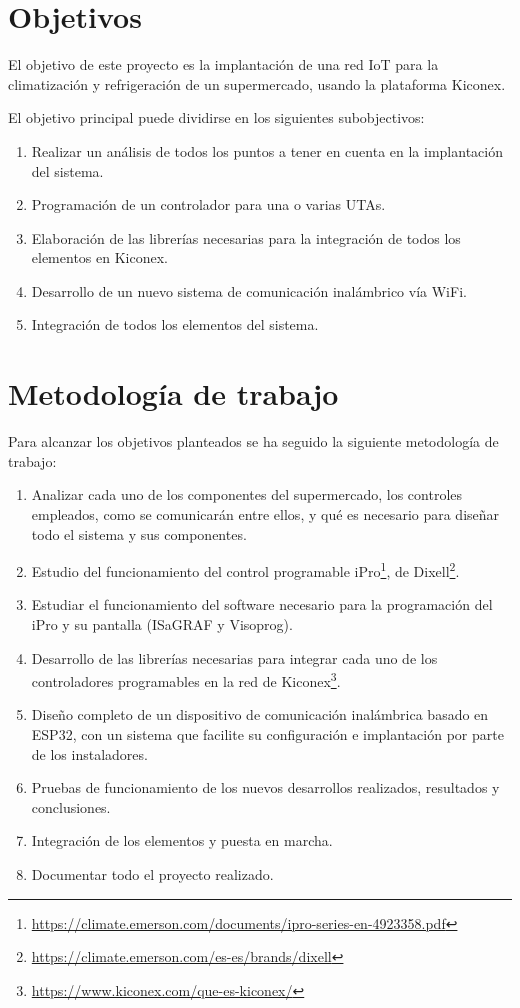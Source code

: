 \section{Objetivos}
\label{sec:objetivos}

El objetivo de este proyecto es la implantación de una red IoT para la climatización y refrigeración de un supermercado, usando la plataforma Kiconex.

El objetivo principal puede dividirse en los siguientes subobjectivos:

\begin{enumerate}
  \item Realizar un análisis de todos los puntos a tener en cuenta en la implantación del sistema.
  \item Programación de un controlador para una o varias UTAs.
  \item Elaboración de las librerías necesarias para la integración de todos los elementos en Kiconex.
  \item Desarrollo de un nuevo sistema de comunicación inalámbrico vía WiFi.
  \item Integración de todos los elementos del sistema.
\end{enumerate}

\section{Metodología de trabajo}
\label{sec:metodologia}

Para alcanzar los objetivos planteados se ha seguido la siguiente metodología de trabajo:

\begin{enumerate}
\item Analizar cada uno de los componentes del supermercado, los controles empleados, como se comunicarán entre ellos, y qué es necesario para diseñar todo el sistema y sus componentes.
\item Estudio del funcionamiento del control programable iPro\footnote{\url{https://climate.emerson.com/documents/ipro-series-en-4923358.pdf}}, de Dixell\footnote{\url{https://climate.emerson.com/es-es/brands/dixell}}.
\item Estudiar el funcionamiento del software necesario para la programación del iPro y su pantalla (ISaGRAF y Visoprog).
\item Desarrollo de las librerías necesarias para integrar cada uno de los controladores programables en la red de Kiconex\footnote{\url{https://www.kiconex.com/que-es-kiconex/}}.
\item Diseño completo de un dispositivo de comunicación inalámbrica basado en ESP32, con un sistema que facilite su configuración e implantación por parte de los instaladores.
\item Pruebas de funcionamiento de los nuevos desarrollos realizados, resultados y conclusiones.
\item Integración de los elementos y puesta en marcha.
\item Documentar todo el proyecto realizado.
\end{enumerate}



